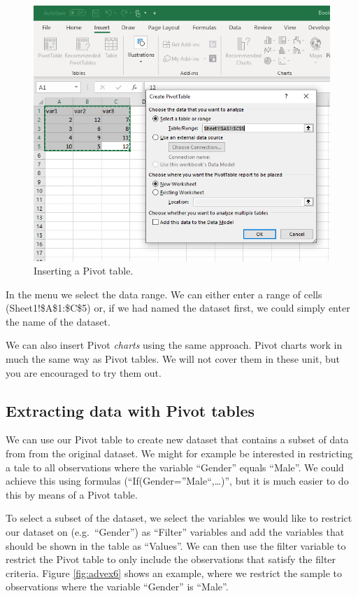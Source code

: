 \documentclass[]{book}
\begin{document}
\begin{figure}

{\centering \includegraphics[width=0.8\linewidth]{_resources/chapter_advexc/4} 

}

\caption{Inserting a Pivot table.}\label{fig:advex5}
\end{figure}

In the menu we select the data range. We can either enter a range of cells (Sheet1!\$A\$1:\$C\$5) or, if we had named the dataset first, we could simply enter the name of the dataset.

We can also insert Pivot \emph{charts} using the same approach. Pivot charts work in much the same way as Pivot tables. We will not cover them in these unit, but you are encouraged to try them out.

\hypertarget{extracting-data-with-pivot-tables}{%
\subsection*{Extracting data with Pivot tables}\label{extracting-data-with-pivot-tables}}

We can use our Pivot table to create new dataset that contains a subset of data from from the original dataset. We might for example be interested in restricting a tale to all observations where the variable ``Gender'' equals ``Male''. We could achieve this using formulas (``If(Gender=''Male``,\ldots)'', but it is much easier to do this by means of a Pivot table.

To select a subset of the dataset, we select the variables we would like to restrict our dataset on (e.g.~``Gender'') as ``Filter'' variables and add the variables that should be shown in the table as ``Values''. We can then use the filter variable to restrict the Pivot table to only include the observations that satisfy the filter criteria. Figure \ref{fig:advex6} shows an example, where we restrict the sample to observations where the variable ``Gender'' is ``Male''.
\end{document}
